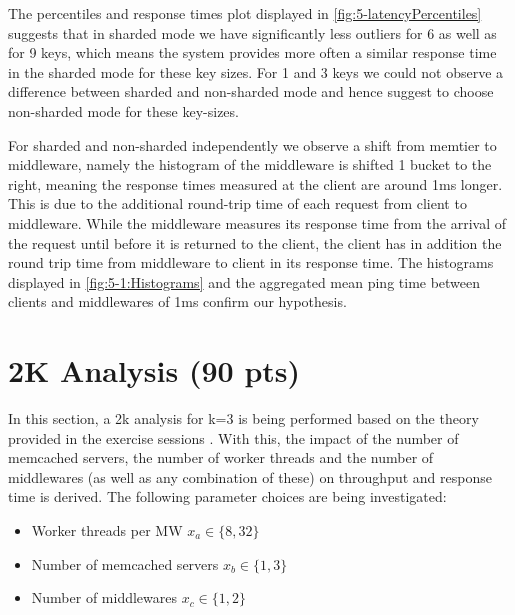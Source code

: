 \documentclass[11pt,a4paper]{article}
\begin{document}
The percentiles and response times plot displayed in \autoref{fig:5-latencyPercentiles} suggests that in sharded mode we have significantly less outliers for 6 as well as for 9 keys, which means the system provides more often a similar response time in the sharded mode for these key sizes. For 1 and 3 keys we could not observe a difference between sharded and non-sharded mode and hence suggest to choose non-sharded mode for these key-sizes.

For sharded and non-sharded independently we observe a shift from memtier to middleware, namely the histogram of the middleware is shifted 1 bucket to the right, meaning the response times measured at the client are around 1ms longer. This is due to the additional round-trip time of each request from client to middleware. While the middleware measures its response time from the arrival of the request until before it is returned to the client, the client has in addition the round trip time from middleware to client in its response time. The histograms displayed in \autoref{fig:5-1:Histograms} and the aggregated mean ping time between clients and middlewares of 1ms confirm our hypothesis.

\section{2K Analysis (90 pts)}

In this section, a 2k analysis for k=3 is being performed based on the theory provided in the exercise sessions \cite{2k}. With this, the impact of the number of memcached servers, the number of worker threads and the number of middlewares (as well as any combination of these) on throughput and response time is derived. The following parameter choices are being investigated:

\begin{itemize}
		
	\item Worker threads per MW $x_a \in \{8, 32\}$
	\item Number of memcached servers $x_b \in \{1, 3\}$
	\item Number of middlewares $x_c \in \{1,2\}$
	      	      
\end{itemize}
\end{document}
